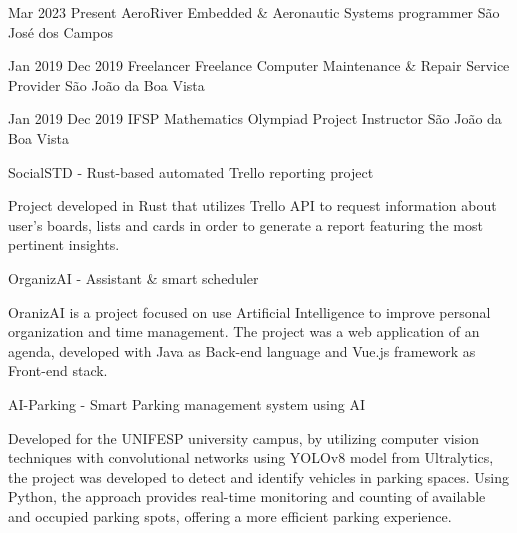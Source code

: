 {Mar 2023}
{Present}
{AeroRiver}
{Embedded \& Aeronautic Systems programmer}
{São José dos Campos}
{
\jbegin
\jend
}

{Jan 2019}
{Dec 2019}
{Freelancer}
{Freelance Computer Maintenance \& Repair Service Provider}
{São João da Boa Vista}
{
\jbegin
\jend
}

{Jan 2019}
{Dec 2019}
{IFSP}
{Mathematics Olympiad Project Instructor}
{São João da Boa Vista}
{
\jbegin
\jend
}

{SocialSTD - Rust-based automated Trello reporting project}
{
\jbegin
    \item{
            Project developed in Rust that utilizes Trello API to request information about 
            user's boards, lists and cards in order to generate a report featuring the most pertinent insights.
         }
\jend
}

{OrganizAI - Assistant \& smart scheduler}
{
\jbegin
    \item{
            OranizAI is a project focused on use Artificial Intelligence to improve personal
            organization and time management. The project was a web application of an agenda, developed with Java
            as Back-end language and Vue.js framework as Front-end stack.
         }
\jend
}

{AI-Parking - Smart Parking management system using AI}
{
\jbegin
    \item{
            Developed for the UNIFESP university campus, by utilizing computer vision techniques with convolutional
            networks using YOLOv8 model from Ultralytics, the project was developed to detect and identify
            vehicles in parking spaces. Using Python, the approach provides real-time
            monitoring and counting of available and occupied parking spots, offering a more efficient parking experience.
         }
\jend
}

